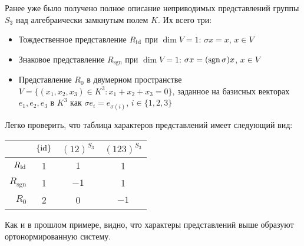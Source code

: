 \begin{example}
	Ранее уже было получено полное описание неприводимых представлений группы $S_3$ над алгебраически замкнутым полем $K$. Их всего три:
	\begin{itemize}
		\item Тождественное представление $R_{\mathrm{id}}$ при $\dim{V} = 1$: $\sigma x = x$, $x \in V$
		\item Знаковое представление $R_{\mathrm{sgn}}$ при $\dim{V} = 1$: $\sigma x = (\operatorname{sgn}\sigma)x$, $x \in V$
		\item Представление $R_0$ в двумерном пространстве $V = \{(x_1, x_2, x_3) \in K^3 : x_1 + x_2 + x_3 = 0\}$, заданное на базисных векторах $e_1, e_2, e_3$ в $K^3$ как $\sigma e_i = e_{\sigma(i)}$, $i \in \{1, 2, 3\}$
	\end{itemize}

	Легко проверить, что таблица характеров представлений имеет следующий вид:
	\begin{center}
		\begin{tabular}{r|c|c|c}
			                   & $\{\mathrm{id}\}$ & $(12)^{S_3}$ & $(123)^{S_3}$ \\ \hline
			           $R_{\mathrm{id}}$ &     1     &     $1$      &       1       \\ \hline
			$R_{\mathrm{sgn}}$ &     1     &     $-1$     &       1       \\ \hline
			             $R_0$ &     2     &      0       &     $-1$
		\end{tabular}
	\end{center}

	Как и в прошлом примере, видно, что характеры представлений выше образуют ортонормированную систему.
\end{example}

